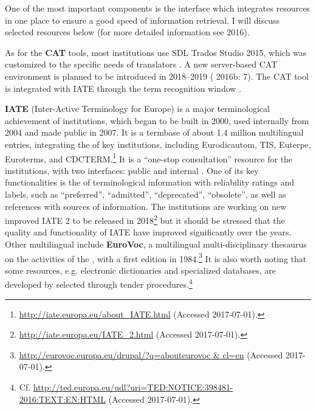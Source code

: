 \documentclass[output=paper]{langsci/langscibook}
\begin{document}
One of the most important components is the interface which integrates resources in one place to ensure a good speed of information retrieval. I will discuss selected resources below (for more detailed information see  2016).

As for the \textbf{CAT} tools, most  institutions use SDL Trados Studio 2015, which was customized to the specific needs of  translators \citep{Trousil2017}. A new server-based CAT environment is planned to be introduced in 2018--2019 ( 2016b: 7). The CAT tool is integrated with IATE through the term recognition window \citep{Trousil2017}. 

\textbf{IATE} (Inter-Active Terminology for Europe) is a major terminological achievement of  institutions, which began to be built in 2000, used internally from 2004 and made public in 2007. It is a termbase of about 1.4 million multilingual entries, integrating the  of key  institutions, including Eurodicautom, TIS, Euterpe, Euroterms, and CDCTERM.\footnote{\url{http://iate.europa.eu/about_IATE.html} (Accessed 2017-07-01).} It is a “one-stop consultation” resource for the institutions, with two interfaces: public and internal \citep{Trousil2017}. One of its key functionalities is the  of terminological information with reliability ratings and labels, such as “preferred'', “admitted'', “deprecated'', “obsolete'', as well as references with sources of information. The institutions are working on new improved IATE 2 to be released in 2018\footnote{\url{http://iate.europa.eu/IATE_2.html} (Accessed 2017-07-01).} but it should be stressed that the quality and functionality of IATE have improved significantly over the years. Other multilingual  include \textbf{EuroVoc}, a multilingual multi-disciplinary thesaurus on the activities of the , with a first edition in 1984.\footnote{\url{http://eurovoc.europa.eu/drupal/?q=abouteurovoc & cl=en} (Accessed 2017-07-01).} It is also worth noting that some resources, e.g. electronic dictionaries and specialized databases, are developed by  selected through tender procedures.\footnote{Cf. \url{http://ted.europa.eu/udl?uri=TED:NOTICE:398481-2016:TEXT:EN:HTML} (Accessed 2017-07-01).}
\end{document}
